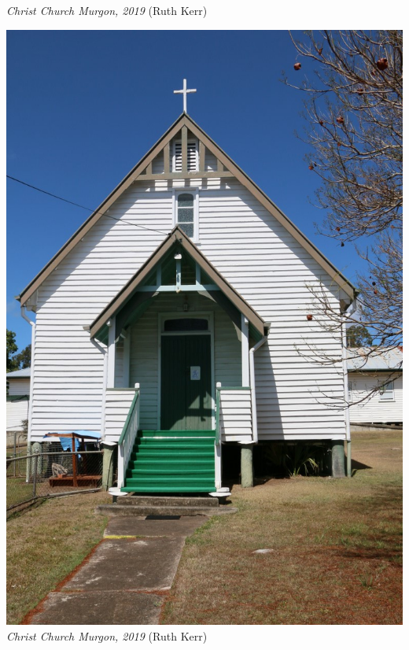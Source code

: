 \documentclass[a4paper,11pt,parskip=never,DIV=8,chapterprefix=true,titlepage=true,twoside,twocolumn,open=any]{scrbook}
\begin{document}
\begin{titlepage}
\begin{minipage}[b]{\textwidth}
\begin{center}
{\small {\itshape Christ Church Murgon, 2019} {\small(Ruth Kerr)}}
\end{center}
\end{minipage}
\newpage
\thispagestyle{empty}
\par\vspace*{.1\textheight}
\noindent\begin{minipage}[t]{\textwidth}
\begin{center}
\includegraphics[width=.8\linewidth,center]{../images/christChurchMurgon_front_2019_11_29.jpg}
{\small {\itshape Christ Church Murgon, 2019} {\small(Ruth Kerr)}}
\end{center}
\end{minipage}\par

\end{titlepage}
\onecolumn
\frontmatter
\end{document}
